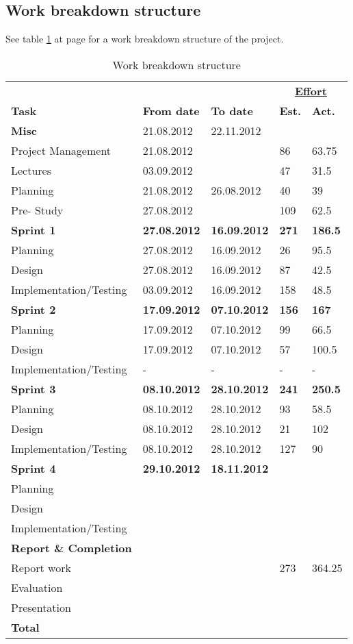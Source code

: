 \subsection{Work breakdown structure}

See table \ref{table:wbs} at page \pageref{table:wbs} for a work breakdown structure of the project.

\begin{table}


\begin{tabular}{ l|l|l|l|l } \hline
&	 &	 &\multicolumn{2}{c}{\underline{\textbf{Effort}}}	 \\
\textbf{Task}	 & \textbf{From date}	 & \textbf{To date}	 & \textbf{Est.} & \textbf{Act.}	 \\ \hline \hline
\textbf{Misc} & 21.08.2012 & 22.11.2012 & & \\ \hline
Project Management & 21.08.2012 & & 86 & 63.75 \\
Lectures & 03.09.2012 & & 47 & 31.5\\
Planning & 21.08.2012 & 26.08.2012 & 40 & 39 \\
Pre- Study &27.08.2012  & & 109 & 62.5\\ \hline
\bf{Sprint 1}	&\bf{27.08.2012} & \bf{16.09.2012} & \bf{271} & \textbf{186.5} \\ \hline
Planning & 27.08.2012 & 16.09.2012 & 26 & 95.5 \\
Design & 27.08.2012 & 16.09.2012 & 87 & 42.5\\
Implementation/Testing & 03.09.2012 & 16.09.2012 & 158 & 48.5\\ \hline
\bf{Sprint 2} & \bf{17.09.2012} & \bf{07.10.2012} & \bf{156} & \textbf{167} \\ \hline
Planning & 17.09.2012 & 07.10.2012 & 99 & 66.5\\
Design& 17.09.2012 & 07.10.2012 & 57 & 100.5\\
Implementation/Testing & - & - & - & -\\ \hline
\bf{Sprint 3}	 & \bf{08.10.2012} & \bf{28.10.2012} & \bf{241} & \textbf{250.5}\\ \hline
Planning & 08.10.2012 & 28.10.2012 & 93 & 58.5 \\
Design & 08.10.2012 & 28.10.2012 & 21 & 102\\
Implementation/Testing & 08.10.2012 & 28.10.2012 & 127 & 90\\ \hline
\bf{Sprint 4}	& \bf{29.10.2012} & \bf{18.11.2012} & \bf{}  &  \\ \hline
Planning & & &  &	 \\
Design& & & & \\
Implementation/Testing & & &  & \\ \hline
\textbf{Report \& Completion} & & & & \\ \hline
Report work & & & 273 & 364.25\\
Evaluation & & & & \\
Presentation && & & \\ \hline
\bf{Total} & & &\bf{}	& \\ \hline
\end{tabular}
\caption{Work breakdown structure} \label{table:wbs}
\end{table}
